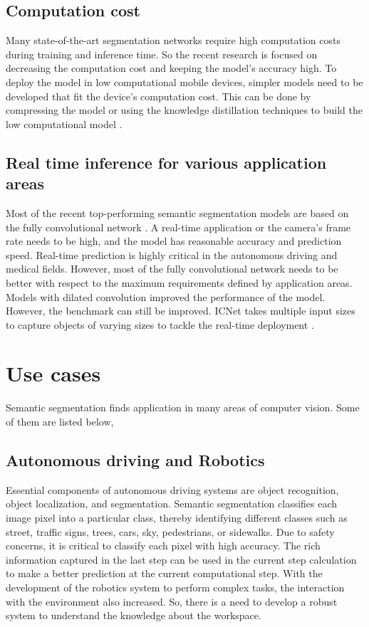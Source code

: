     \subsection{Computation cost}
    
    Many state-of-the-art segmentation networks require high computation costs during training and inference time. So the recent research is focused on decreasing the computation cost and keeping the model's accuracy high. To deploy the model in low computational mobile devices, simpler models need to be developed that fit the device's computation cost. This can be done by compressing the model or using the knowledge distillation techniques to build the low computational model \cite{25_minaee2021image}. 
    
    \subsection{Real time inference for various application areas}
	
	Most of the recent top-performing semantic segmentation models are based on the fully convolutional network \cite{31_chen2014semantic}. A real-time application or the camera's frame rate needs to be high, and the model has reasonable accuracy and prediction speed. Real-time prediction is highly critical in the autonomous driving and medical fields. However, most of the fully convolutional network needs to be better with respect to the maximum requirements defined by application areas. Models with dilated convolution improved the performance of the model. However, the benchmark can still be improved. ICNet takes multiple input sizes to capture objects of varying sizes to tackle the real-time deployment \cite{32_zhao2018icnet}.       

	\section{Use cases}
	
	Semantic segmentation finds application in many areas of computer vision. Some of them are listed below,
	\subsection{Autonomous driving and Robotics}
	
	Essential components of autonomous driving systems are object recognition, object localization, and segmentation. Semantic segmentation classifies each image pixel into a particular class, thereby identifying different classes such as street, traffic signs, trees, cars, sky, pedestrians, or sidewalks. Due to safety concerns, it is critical to classify each pixel with high accuracy. The rich information captured in the last step can be used in the current step calculation to make a better prediction at the current computational step. With the development of the robotics system to perform complex tasks, the interaction with the environment also increased. So, there is a need to develop a robust system to understand the knowledge about the workspace. 
	 

